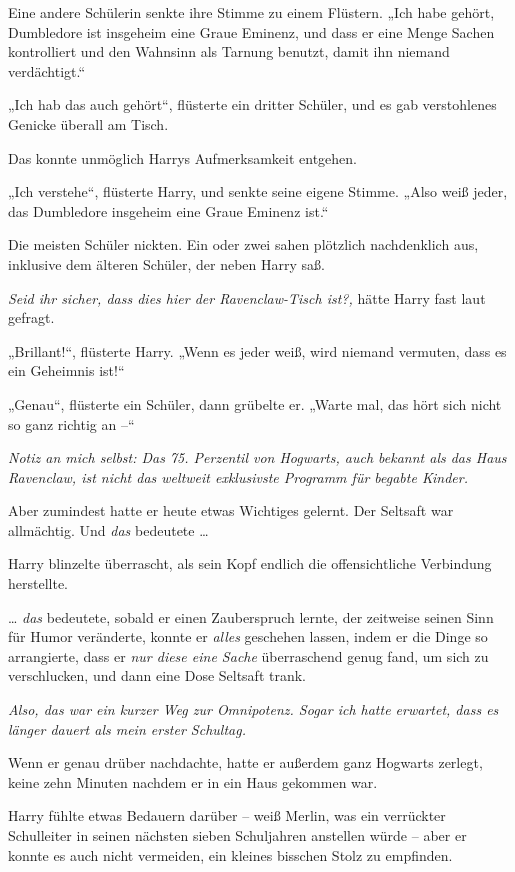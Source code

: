 Eine andere Schülerin senkte ihre Stimme zu einem Flüstern. „Ich habe gehört, Dumbledore ist insgeheim eine Graue Eminenz, und dass er eine Menge Sachen kontrolliert und den Wahnsinn als Tarnung benutzt, damit ihn niemand verdächtigt.“

„Ich hab das auch gehört“, flüsterte ein dritter Schüler, und es gab verstohlenes Genicke überall am Tisch.

Das konnte unmöglich Harrys Aufmerksamkeit entgehen.

„Ich verstehe“, flüsterte Harry, und senkte seine eigene Stimme. „Also weiß jeder, das Dumbledore insgeheim eine Graue Eminenz ist.“

Die meisten Schüler nickten. Ein oder zwei sahen plötzlich nachdenklich aus, inklusive dem älteren Schüler, der neben Harry saß.

\emph{Seid ihr sicher, dass dies hier der Ravenclaw-Tisch ist?,} hätte Harry fast laut gefragt.

„Brillant!“, flüsterte Harry. „Wenn es jeder weiß, wird niemand vermuten, dass es ein Geheimnis ist!“

„Genau“, flüsterte ein Schüler, dann grübelte er. „Warte mal, das hört sich nicht so ganz richtig an –“

\emph{Notiz an mich selbst: Das 75. Perzentil von Hogwarts, auch bekannt als das Haus Ravenclaw, ist nicht das weltweit exklusivste Programm für begabte Kinder.}

Aber zumindest hatte er heute etwas Wichtiges gelernt. Der Seltsaft war allmächtig. Und \emph{das} bedeutete …

Harry blinzelte überrascht, als sein Kopf endlich die offensichtliche Verbindung herstellte.

… \emph{das} bedeutete, sobald er einen Zauberspruch lernte, der zeitweise seinen Sinn für Humor veränderte, konnte er \emph{alles} geschehen lassen, indem er die Dinge so arrangierte, dass er \emph{nur diese eine Sache} überraschend genug fand, um sich zu verschlucken, und dann eine Dose Seltsaft trank.

\emph{Also, das war ein kurzer Weg zur Omnipotenz. Sogar ich hatte erwartet, dass es länger dauert als mein erster Schultag.}

Wenn er genau drüber nachdachte, hatte er außerdem ganz Hogwarts zerlegt, keine zehn Minuten nachdem er in ein Haus gekommen war.

Harry fühlte etwas Bedauern darüber – weiß Merlin, was ein verrückter Schulleiter in seinen nächsten sieben Schuljahren anstellen würde – aber er konnte es auch nicht vermeiden, ein kleines bisschen Stolz zu empfinden.

